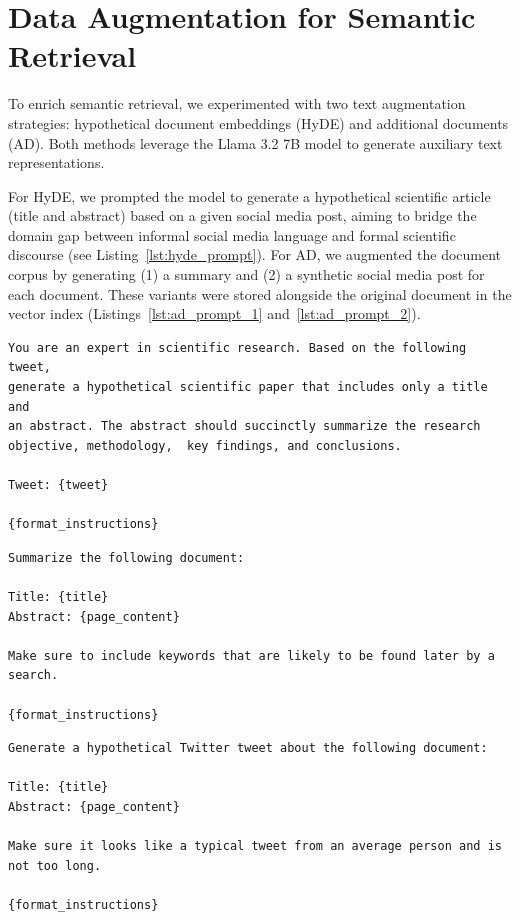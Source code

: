 \section{Data Augmentation for Semantic Retrieval}\label{sec:prompt_templates}
To enrich semantic retrieval, we experimented with two text augmentation strategies: hypothetical document embeddings (HyDE) \cite{gao_precise_2023} and additional documents (AD). Both methods leverage the Llama 3.2 7B model \cite{grattafiori_llama_2024} to generate auxiliary text representations.

For HyDE, we prompted the model to generate a hypothetical scientific article (title and abstract) based on a given social media post, aiming to bridge the domain gap between informal social media language and formal scientific discourse (see Listing~\ref{lst:hyde_prompt}). For AD, we augmented the document corpus by generating (1) a summary and (2) a synthetic social media post for each document. These variants were stored alongside the original document in the vector index (Listings~\ref{lst:ad_prompt_1} and~\ref{lst:ad_prompt_2}).

\begin{center}
\begin{minipage}{0.8\linewidth}
\begin{lstlisting}[style=promptstyle, caption={Prompt template to generate hypothetical document embeddings.}, label={lst:hyde_prompt}]
You are an expert in scientific research. Based on the following tweet,
generate a hypothetical scientific paper that includes only a title and
an abstract. The abstract should succinctly summarize the research
objective, methodology,  key findings, and conclusions.

Tweet: {tweet}

{format_instructions}
\end{lstlisting}

\begin{lstlisting}[style=promptstyle, caption={Summary Prompt Template for AD}, label={lst:ad_prompt_1}]
Summarize the following document:

Title: {title}
Abstract: {page_content}

Make sure to include keywords that are likely to be found later by a
search.

{format_instructions}
\end{lstlisting}

\begin{lstlisting}[style=promptstyle, caption={Tweet Prompt template to generate additional documents.}, label={lst:ad_prompt_2}]
Generate a hypothetical Twitter tweet about the following document:

Title: {title}
Abstract: {page_content}

Make sure it looks like a typical tweet from an average person and is
not too long.

{format_instructions}
\end{lstlisting}
\end{minipage}
\end{center}



